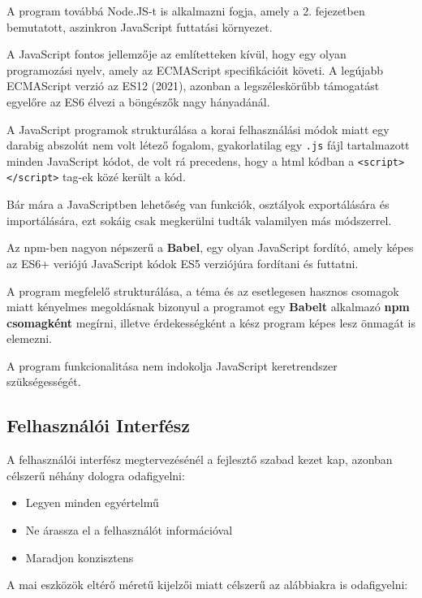 A program továbbá Node.JS-t is alkalmazni fogja, amely a 2. fejezetben bemutatott, aszinkron JavaScript futtatási környezet.

A JavaScript fontos jellemzője az említetteken kívül, hogy egy olyan programozási nyelv, amely az ECMAScript specifikációit követi. A legújabb ECMAScript verzió az ES12 (2021), azonban a legszéleskörűbb támogatást egyelőre az ES6 élvezi a böngészők nagy hányadánál. 

A JavaScript programok strukturálása a korai felhasználási módok miatt egy darabig abszolút nem volt létező fogalom, gyakorlatilag egy \texttt{.js} fájl tartalmazott minden JavaScript kódot, de volt rá precedens, hogy a html kódban a \texttt{<script></script>} tag-ek közé került a kód.

Bár mára a JavaScriptben lehetőség van funkciók, osztályok exportálására és importálására, ezt sokáig csak megkerülni tudták valamilyen más módszerrel.

Az npm-ben nagyon népszerű a \textbf{Babel}, egy olyan JavaScript fordító, amely képes az ES6+ veriójú JavaScript kódok ES5 verziójúra fordítani és futtatni.

A program megfelelő strukturálása, a téma és az esetlegesen hasznos csomagok miatt kényelmes megoldásnak bizonyul a programot egy \textbf{Babelt} alkalmazó \textbf{npm csomagként} megírni, illetve érdekességként a kész program képes lesz önmagát is elemezni.

A program funkcionalitása nem indokolja JavaScript keretrendszer szükségességét.

\pagebreak


\subsection{Felhasználói Interfész}

A felhasználói interfész megtervezésénél a fejlesztő szabad kezet kap, azonban célszerű néhány dologra odafigyelni:

\begin{itemize}
	\item Legyen minden egyértelmű
	\item Ne árassza el a felhasználót információval
	\item Maradjon konzisztens
\end{itemize}

\noindent A mai eszközök eltérő méretű kijelzői miatt célszerű az alábbiakra is odafigyelni:

